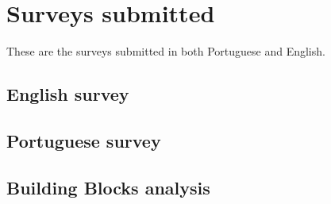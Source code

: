 \chapter{Surveys submitted}

These are the surveys submitted in both Portuguese and English.

\section{ English survey}
\label{appendix:a1}



\section{ Portuguese survey}
\label{appendix:a2}


\section{Building Blocks analysis}
\label{appendix:a3}
